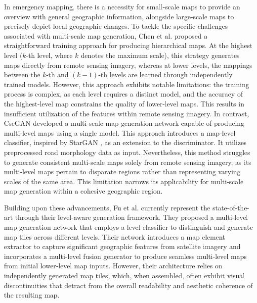 In emergency mapping, there is a necessity for small-scale maps to provide an overview with general geographic information, alongside large-scale maps to precisely depict local geographic changes. To tackle the specific challenges associated with multi-scale map generation, Chen et al. \cite{Chen2022GeneratingMultiscaleMaps} proposed a straightforward training approach for producing hierarchical maps. At the highest level (\(k\)-th level, where \(k\) denotes the maximum scale), this strategy generates maps directly from remote sensing imagery, whereas at lower levels, the mappings between the \(k\)-th and \((k-1)\)-th levels are learned through independently trained models. However, this approach exhibits notable limitations: the training process is complex, as each level requires a distinct model, and the accuracy of the highest-level map constrains the quality of lower-level maps. This results in insufficient utilization of the features within remote sensing imagery. In contrast, CscGAN \cite{Liu2021CscGANconditionalscaleconsistent} developed a multi-scale map generation network capable of producing multi-level maps using a single model. This approach introduces a map-level classifier, inspired by StarGAN \cite{Choi2018StarGANUnifiedGenerative}, as an extension to the discriminator. It utilizes preprocessed road morphology data as input. Nevertheless, this method struggles to generate consistent multi-scale maps solely from remote sensing imagery, as its multi-level maps pertain to disparate regions rather than representing varying scales of the same area. This limitation narrows its applicability for multi-scale map generation within a cohesive geographic region.

Building upon these advancements, Fu et al. \cite{Fu2023Levelawareconsistentmultilevel} currently represent the state-of-the-art through their level-aware generation framework. They proposed a multi-level map generation network that employs a level classifier to distinguish and generate map tiles across different levels. Their network introduces a map element extractor to capture significant geographic features from satellite imagery and incorporates a multi-level fusion generator to produce seamless multi-level maps from initial lower-level map inputs. However, their architecture relies on independently generated map tiles, which, when assembled, often exhibit visual discontinuities that detract from the overall readability and aesthetic coherence of the resulting map.

